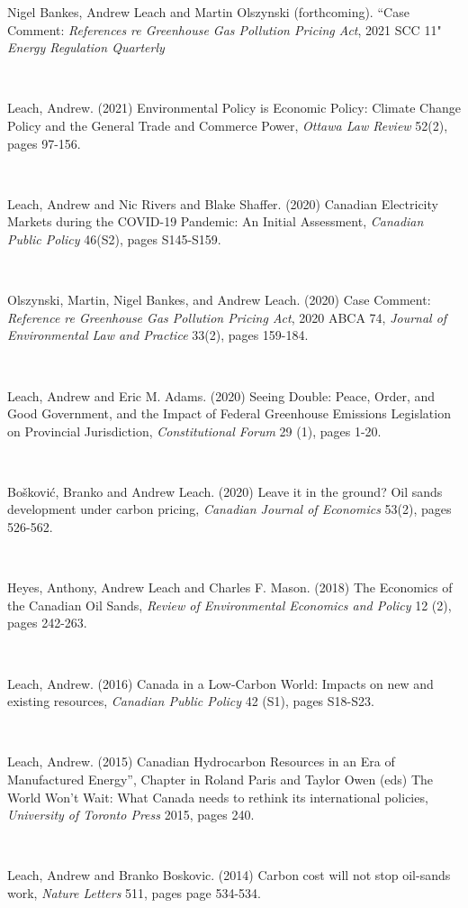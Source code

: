 \documentclass{article}[12pt]
\newcommand{\negind}{\hspace*{-15pt}}
\newcommand{\publication}[6]{\parbox[b]{.93\textwidth}{\negind #1. (#2) #3, \textit{#4} #5, pages #6.}
\hfill \\[-.65ex]}
\newcommand{\inprogress}[3]{\parbox[b]{.93\textwidth}{\negind #1. ``#2" #3  }
\\[-.65ex] \hfill}
\newcommand{\justlist}[1]{\negind #1 \smallskip}
\begin{document}



\inprogress{Nigel Bankes, Andrew Leach and Martin Olszynski (forthcoming)}{Case Comment: \textit{References re Greenhouse Gas Pollution Pricing Act}, 2021 SCC 11}{\textit{Energy Regulation Quarterly}}

\publication{Leach, Andrew}{2021}{Environmental Policy is Economic Policy:
Climate Change Policy and the General Trade and Commerce Power}{\textit{Ottawa Law Review}}{52(2)}{97-156}

\publication{Leach, Andrew and Nic Rivers and Blake Shaffer}{2020}{Canadian Electricity Markets during the COVID-19 Pandemic: An Initial Assessment}{\textit{Canadian Public Policy}}{46(S2)}{S145-S159}


\publication{Olszynski, Martin, Nigel Bankes, and Andrew Leach}{2020}{Case Comment: \textit{Reference re Greenhouse Gas Pollution Pricing Act}, 2020 ABCA 74}{\textit{Journal of Environmental Law and Practice}}{33(2)}{159-184}


\publication{Leach, Andrew and Eric M. Adams}{2020}{Seeing Double: Peace, Order, and Good Government, and the Impact of Federal Greenhouse Emissions Legislation on Provincial Jurisdiction}{\textit{Constitutional Forum}}{29 (1)}{1-20}


\publication{Bo\v skovi\'{c}, Branko and Andrew Leach}{2020}{Leave it in the ground? Oil sands development under carbon pricing}{\textit{Canadian Journal of Economics}}{53(2)}{526-562}

\publication{Heyes, Anthony, Andrew Leach and Charles F. Mason}{2018}{The Economics of the Canadian Oil Sands}{\textit{Review of Environmental Economics and Policy}}{12 (2)}{242-263}

\publication{Leach, Andrew}{2016}{Canada in a Low-Carbon World: Impacts on new and existing resources}{\textit{Canadian Public Policy}}{42 (S1)}{S18-S23}

\publication{Leach, Andrew}{2015}{Canadian Hydrocarbon Resources in an Era of Manufactured Energy”, Chapter in Roland Paris and Taylor Owen (eds) The World Won't Wait: What Canada needs to rethink its international policies}{University of Toronto Press}{2015}{240}

\publication{Leach, Andrew and Branko Boskovic}{2014}{Carbon cost will not stop oil-sands work}{\textit{Nature} Letters}{511}{page 534-534}
\end{document}
